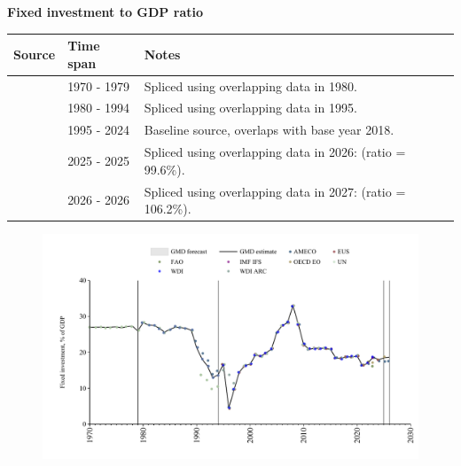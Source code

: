 \documentclass[12pt,a4paper,landscape]{article}
\begin{document}
\begin{adjustbox}{max totalsize={\paperwidth}{\paperheight},center}
\begin{minipage}[t][\textheight][t]{\textwidth}
\vspace*{0.5cm}
{}
\begin{center}
{\Large\bfseries Fixed investment to GDP ratio}
\end{center}
\vspace{0.5cm}
\begin{table}[H]
\centering
\small
\begin{tabular}{|l|l|l|}
\hline
\textbf{Source} & \textbf{Time span} & \textbf{Notes} \\
\hline
\rowcolor{white}\cite{UN}& 1970 - 1979 &Spliced using overlapping data in 1980. \\
\rowcolor{lightgray}\cite{WDI}& 1980 - 1994 &Spliced using overlapping data in 1995. \\
\rowcolor{white}\cite{EUS}& 1995 - 2024 &Baseline source, overlaps with base year 2018. \\
\rowcolor{lightgray}\cite{OECD_EO}& 2025 - 2025 &Spliced using overlapping data in 2026: (ratio = 99.6\%). \\
\rowcolor{white}\cite{AMECO}& 2026 - 2026 &Spliced using overlapping data in 2027: (ratio = 106.2\%). \\
\hline
\end{tabular}
\end{table}
\begin{figure}[H]
\centering
\includegraphics[width=\textwidth,height=0.6\textheight,keepaspectratio]{graphs/BGR_finv_GDP.pdf}
\end{figure}
\end{minipage}
\end{adjustbox}
\end{document}
